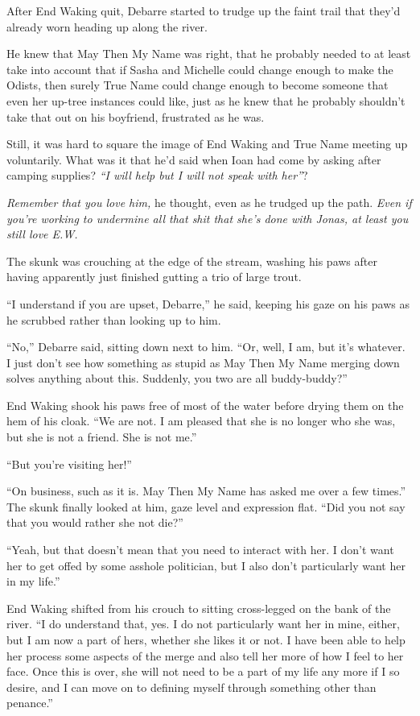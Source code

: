 After End Waking quit, Debarre started to trudge up the faint trail that they'd already worn heading up along the river.

He knew that May Then My Name was right, that he probably needed to at least take into account that if Sasha and Michelle could change enough to make the Odists, then surely True Name could change enough to become someone that even her up-tree instances could like, just as he knew that he probably shouldn't take that out on his boyfriend, frustrated as he was.

Still, it was hard to square the image of End Waking and True Name meeting up voluntarily. What was it that he'd said when Ioan had come by asking after camping supplies? \emph{``I will help but I will not speak with her''}?

\emph{Remember that you love him,} he thought, even as he trudged up the path. \emph{Even if you're working to undermine all that shit that she's done with Jonas, at least you still love E.W.}

The skunk was crouching at the edge of the stream, washing his paws after having apparently just finished gutting a trio of large trout.

``I understand if you are upset, Debarre,'' he said, keeping his gaze on his paws as he scrubbed rather than looking up to him.

``No,'' Debarre said, sitting down next to him. ``Or, well, I am, but it's whatever. I just don't see how something as stupid as May Then My Name merging down solves anything about this. Suddenly, you two are all buddy-buddy?''

End Waking shook his paws free of most of the water before drying them on the hem of his cloak. ``We are not. I am pleased that she is no longer who she was, but she is not a friend. She is not me.''

``But you're visiting her!''

``On business, such as it is. May Then My Name has asked me over a few times.'' The skunk finally looked at him, gaze level and expression flat. ``Did you not say that you would rather she not die?''

``Yeah, but that doesn't mean that you need to interact with her. I don't want her to get offed by some asshole politician, but I also don't particularly want her in my life.''

End Waking shifted from his crouch to sitting cross-legged on the bank of the river. ``I do understand that, yes. I do not particularly want her in mine, either, but I am now a part of hers, whether she likes it or not. I have been able to help her process some aspects of the merge and also tell her more of how I feel to her face. Once this is over, she will not need to be a part of my life any more if I so desire, and I can move on to defining myself through something other than penance.''

